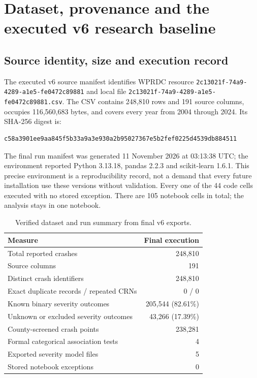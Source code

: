 \documentclass[11pt,a4paper,openany]{report}
\newcommand{\pathcode}[1]{\nolinkurl{#1}}
\begin{document}
\chapter{Dataset, provenance and the executed v6 research baseline}
\section{Source identity, size and execution record}
The executed v6 source manifest identifies WPRDC resource \pathcode{2c13021f-74a9-4289-a1e5-fe0472c89881} and local file \pathcode{2c13021f-74a9-4289-a1e5-fe0472c89881.csv}. The CSV contains 248,810 rows and 191 source columns, occupies 116,560,683 bytes, and covers every year from 2004 through 2024. Its SHA-256 digest is:
\begin{lstlisting}
c58a3901ee9aa845f5b33a9a3e930a2b95027367e5b2fef0225d4539db884511
\end{lstlisting}
The final run manifest was generated 11 November 2026 at 03:13:38 UTC; the environment reported Python 3.13.18, pandas 2.2.3 and scikit-learn 1.6.1. This precise environment is a reproducibility record, not a demand that every future installation use these versions without validation. Every one of the 44 code cells executed with no stored exception. There are 105 notebook cells in total; the analysis stays in one notebook.

\begin{table}[htbp]\centering\small
\caption{Verified dataset and run summary from final v6 exports.}
\begin{tabular}{@{}lr@{}}\toprule Measure & Final execution\\\midrule
Total reported crashes & 248,810\\
Source columns & 191\\
Distinct crash identifiers & 248,810\\
Exact duplicate records / repeated CRNs & 0 / 0\\
Known binary severity outcomes & 205,544 (82.61\%)\\
Unknown or excluded severity outcomes & 43,266 (17.39\%)\\
County-screened crash points & 238,281\\
Formal categorical association tests & 4\\
Exported severity model files & 5\\
Stored notebook exceptions & 0\\
\bottomrule\end{tabular}
\end{table}
\end{document}
